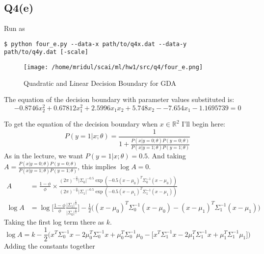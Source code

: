 \documentclass[11pt]{article}
\begin{document}
\subsection{Q4(e)}
\label{sec:org88a0269}
\begin{codebox}
Run as
\begin{verbatim}
$ python four_e.py --data-x path/to/q4x.dat --data-y
path/to/q4y.dat [-scale]
\end{verbatim}
\end{codebox}
\begin{figure}[!ht]
\centering
\texttt{[image: /home/mridul/scai/ml/hw1/src/q4/four\_e.png]}
\caption{\label{fig:orgb252f3d}Quadratic and Linear Decision Boundary for GDA}
\end{figure}
The equation of the decision boundary with parameter values substituted is:
\begin{equation*}
-0.8746x_2^2 + 0.67812x_1^2 + 2.5996x_1x_2 + 5.748x_2 - -7.654x_1 - 1.1695739 =0
\end{equation*}
\par
To get the equation of the decision boundary when
\(x\in\mathbb{R}^2\) I'll begin here:
\begin{equation}
P(y=1|x;\theta)=\frac{1}{1+\frac{P(x|y=0;\theta)P(y=0;\theta)}{P(x|y=1;\theta)P(y=1;\theta)}}
\end{equation}
As in the lecture, we want \(P(y=1|x;\theta)=0.5\). And taking
\(A=\frac{P(x|y=0;\theta)P(y=0;\theta)}{P(x|y=1;\theta)P(y=1;\theta)}\),
this implies \(\log A=0\).
\begin{align*}
A &=
\frac{1-\phi}{\phi}\times\frac{(2\pi)^{-\frac{n}{2}}\lvert\Sigma_0\rvert^{-0.5}\exp(-0.5(x-\mu_0)^T\Sigma^{-1}_0(x-\mu_0))}{(2\pi)^{-\frac{n}{2}}\lvert\Sigma_1\rvert^{-0.5}\exp(-0.5(x-\mu_1)^T\Sigma^{-1}_1(x-\mu_1))}\\
\log A &= \log\Biggl[\frac{1-\phi}{\phi}\frac{\lvert\Sigma_1\rvert^{\frac{1}{2}}}{\lvert\Sigma_0\rvert^{\frac{1}{2}}}\Biggr]-\frac{1}{2}\bigl((x-\mu_0)^T\Sigma^{-1}_0(x-\mu_0)-(x-\mu_1)^T\Sigma^{-1}_1(x-\mu_1)\bigr)
\end{align*}
Taking the first log term there as \(k\).
\begin{equation*}
\log A = k - \frac{1}{2}\bigl(
x^T\Sigma^{-1}_0x-2\mu_0^T\Sigma^{-1}_0x+\mu_0^T\Sigma^{-1}_0\mu_0
-\bigl[
x^T\Sigma^{-1}_1x-2\mu_1^T\Sigma^{-1}_1x+\mu_1^T\Sigma^{-1}_1\mu_1
\bigr]
\bigr)
\end{equation*}
Adding the constants together
\end{document}
